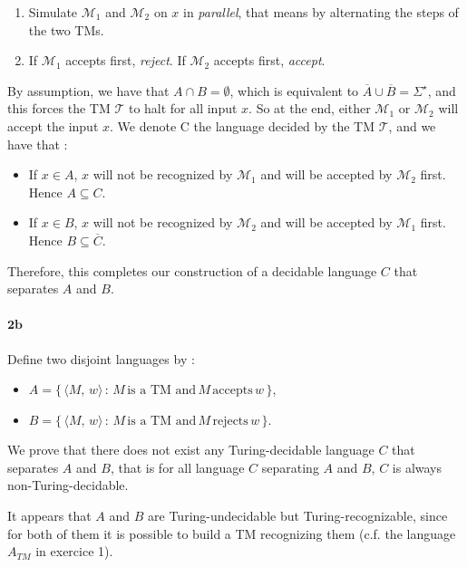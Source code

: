 \documentclass{article}
\newcommand\Ccancel[2][black]{\renewcommand\CancelColor{\color{#1}}\cancel{#2}}
\begin{document}
\begin{enumerate}[noitemsep, topsep=0pt]
    \item Simulate $\mathcal{M}_1$ and $\mathcal{M}_2$ on $x$ in \textit{parallel}, that means by alternating the steps of the two TMs.
    \item If $\mathcal{M}_1$ accepts first, \textit{reject}. If $\mathcal{M}_2$ accepts first, \textit{accept}.
\end{enumerate}
By assumption, we have that $A\cap B =\emptyset$, which is equivalent to $\overline{A}\cup \overline{B} =\Sigma^\star$, and this forces the TM $\mathcal{T}$ to halt for all input $x$. So at the end, either $\mathcal{M}_1$ or $\mathcal{M}_2$ will accept the input $x$. We denote C the language decided by the TM $\mathcal{T}$, and we have that :
\begin{itemize}[noitemsep, topsep=0pt]
    \item If $x\in A$, $x$ will not be recognized by $\mathcal{M}_1$ and will be accepted by $\mathcal{M}_2$ first. Hence $A\subseteq C$.
    \item If \Ccancel[red]{$x\notin A\Rightarrow$} $x\in B$, $x$ will not be recognized by $\mathcal{M}_2$ and will be accepted by $\mathcal{M}_1$ first. Hence $B\subseteq\overline{C}$.
\end{itemize}

\noindent Therefore, this completes our construction of a decidable language $C$ that
\linebreak separates $A$ and $B$.

\paragraph{$\mathbf{2b}$} Define two disjoint languages by :
\begin{itemize}
    \item [] $A=\{\,\langle M,\,w\rangle\,:\,M\,\text{is a TM and}\,M\,\text{accepts}\,w\,\}$,
    \item [] $B=\{\,\langle M,\,w\rangle\,:\,M\,\text{is a TM and}\,M\,\text{rejects}\,w\,\}$.
\end{itemize}
We prove that there does not exist any Turing-decidable language $C$ that separates $A$ and $B$, that is for all language $C$ separating $A$ and $B$, $C$ is always non-Turing-decidable.

It appears that $A$ and $B$ are Turing-undecidable but Turing-recognizable, since for both of them it is possible to build a TM recognizing them (c.f. the language $A_{TM}$ in exercice 1). 
\end{document}
